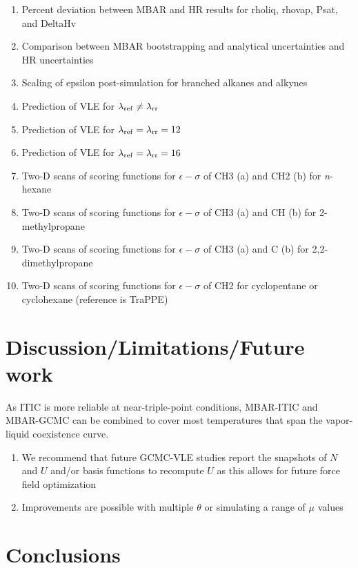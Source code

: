\documentclass[journal=jced,manuscript=article]{achemso}
\begin{document}
\begin{enumerate}
	\item Percent deviation between MBAR and HR results for rholiq, rhovap, Psat, and DeltaHv
	\item Comparison between MBAR bootstrapping and analytical uncertainties and HR uncertainties
	\item Scaling of epsilon post-simulation for branched alkanes and alkynes
	\item Prediction of VLE for $\lambda_{\rm ref} \neq \lambda_{\rm rr}$
	\item Prediction of VLE for $\lambda_{\rm ref} = \lambda_{\rm rr} = 12$
	\item Prediction of VLE for $\lambda_{\rm ref} = \lambda_{\rm rr} = 16$
	\item Two-D scans of scoring functions for $\epsilon-\sigma$ of CH3 (a) and CH2 (b) for \textit{n}-hexane
	\item Two-D scans of scoring functions for $\epsilon-\sigma$ of CH3 (a) and CH (b) for 2-methylpropane
	\item Two-D scans of scoring functions for $\epsilon-\sigma$ of CH3 (a) and C (b) for 2,2-dimethylpropane
	\item Two-D scans of scoring functions for $\epsilon-\sigma$ of CH2 for cyclopentane or cyclohexane (reference is TraPPE)
\end{enumerate}

\section{Discussion/Limitations/Future work} \label{sec: Discussion}

As ITIC is more reliable at near-triple-point conditions, MBAR-ITIC and MBAR-GCMC can be combined to cover most temperatures that span the vapor-liquid coexistence curve.

\begin{enumerate}
	\item We recommend that future GCMC-VLE studies report the snapshots of $N$ and $U$ and/or basis functions to recompute $U$ as this allows for future force field optimization
	\item Improvements are possible with multiple $\theta$ or simulating a range of $\mu$ values
\end{enumerate}

\section{Conclusions} \label{sec: Conclusions}
\end{document}
